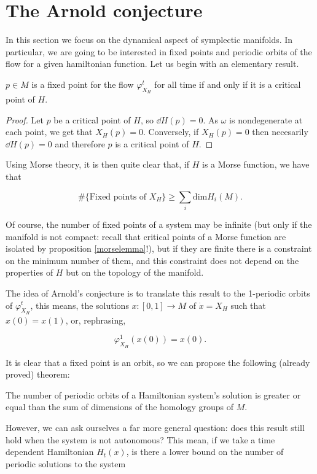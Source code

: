 \section{The Arnold conjecture}

In this section we focus on the dynamical aspect of symplectic manifolds. In particular, we are going to be interested in fixed points and periodic orbits of the flow for a given hamiltonian function. Let us begin with an elementary result.

\begin{prop}
$p \in M$ is a fixed point for the flow $\varphi_{X_H}^t$ for all time if and only if it is a critical point of $H$.
\end{prop}

\begin{proof}
Let $p$ be a critical point of $H$, so $\dd H(p) = 0$. As $\omega$ is nondegenerate at each point, we get that $X_H(p) = 0$. Conversely, if $X_H(p) = 0$ then necesarily $\dd H(p) = 0$ and therefore $p$ is a critical point of $H$.
\end{proof}

Using Morse theory, it is then quite clear that, if $H$ is a Morse function, we have that

$$\# \{\text{Fixed points of } X_H\} \geq \sum_i \text{dim}H_i(M) .$$

Of course, the number of fixed points of a system may be infinite (but only if the manifold is not compact: recall that critical points of a Morse function are isolated by proposition \ref{morselemma}!), but if they are finite there is a constraint on the minimum number of them, and this constraint does not depend on the properties of $H$ but on the topology of the manifold.

The idea of Arnold's conjecture is to translate this result to the 1-periodic orbits of $\varphi_{X_H}^t$, this means, the solutions $x : [0,1] \rightarrow M$ of $\dot{x} = X_H$ such that $x(0) = x(1)$, or, rephrasing,

$$\varphi_{X_H}^1(x(0)) = x(0) .$$

It is clear that a fixed point is an orbit, so we can propose the following (already proved) theorem:

\begin{theo}
The number of periodic orbits of a Hamiltonian system's solution is greater or equal than the sum of dimensions of the homology groups of $M$.
\end{theo}

However, we can ask ourselves a far more general question: does this result still hold when the system is not autonomous? This mean, if we take a time dependent Hamiltonian $H_t(x)$, is there a lower bound on the number of periodic solutions to the system

